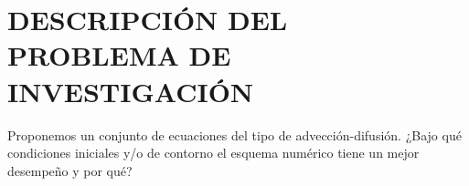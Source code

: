 \section{DESCRIPCIÓN DEL PROBLEMA DE INVESTIGACIÓN}

Proponemos un conjunto de ecuaciones del tipo de advección-difusión.
¿Bajo qué condiciones iniciales y/o de contorno el esquema numérico
tiene un mejor desempeño y por qué?